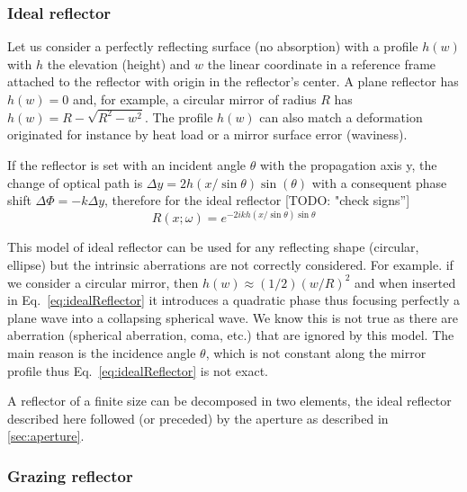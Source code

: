 \documentclass[]{spie}  %
\newcommand{\todo}[1]{{\color{red}[TODO: "#1'']}}
\begin{document}
\subsubsection{Ideal reflector}
\label{sec:idealReflector}

Let us consider a perfectly reflecting surface (no absorption) with a profile $h(w)$ with $h$ the elevation (height) and $w$ the linear coordinate in a reference frame attached to the reflector with origin in the reflector's center. A plane reflector has $h(w)=0$ and, for example, a circular mirror of radius $R$ has $h(w)=R-\sqrt{R^2 - w^2}$. The profile $h(w)$ can also match a deformation originated for instance by heat load or a mirror surface error (waviness).

If the reflector is set with an incident angle $\theta$ with the propagation axis y, the change of optical path is $\Delta y = 2 h(x/\sin \theta) \sin(\theta)$ with a consequent phase shift $\Delta \Phi = - k \Delta y $, therefore for the ideal reflector \todo{check signs}
\begin{equation}
\label{eq:idealReflector}
    R(x;\omega) = e^{-2 i k h(x/\sin \theta) \sin \theta}
\end{equation} 

This model of ideal reflector can be used for any reflecting shape (circular, ellipse) but the intrinsic aberrations are not correctly considered. For example. if we consider a circular mirror, then $h(w) \approx (1/2) (w/R)^2$ and when inserted in Eq.~\ref{eq:idealReflector} it introduces a quadratic phase thus focusing perfectly a plane wave into a collapsing spherical wave. We know this is not true as there are aberration (spherical aberration, coma, etc.) that are ignored by this model. The main reason is the incidence angle $\theta$, which is not constant along the mirror profile thus Eq.~\ref{eq:idealReflector} is not exact.

A reflector of a finite size can be decomposed in two elements, the ideal reflector described here followed (or preceded) by the aperture as described in \ref{sec:aperture}.

\subsubsection{Grazing reflector}
\label{sec:grazingReflector}
\end{document}
